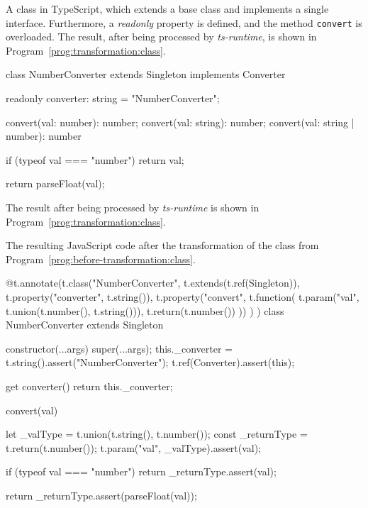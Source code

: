\begin{program}
\caption{A class in TypeScript, which extends a base class and implements a single interface. Furthermore, a \emph{readonly} property is defined, and the method \texttt{convert} is overloaded. The result, after being processed by \emph{ts-runtime}, is shown in Program~\ref{prog:transformation:class}.}
\label{prog:before-transformation:class}
\begin{JsCode}
class NumberConverter extends Singleton implements Converter {

  readonly converter: string = "NumberConverter";

  convert(val: number): number;
  convert(val: string): number;
  convert(val: string | number): number {
    if (typeof val === "number") {
      return val;
    }
        
    return parseFloat(val);
  }

}
\end{JsCode}
\end{program}
The result after being processed by \emph{ts-runtime} is shown in Program~\ref{prog:transformation:class}.
\begin{program}
\caption{The resulting JavaScript code after the transformation of the class from Program~\ref{prog:before-transformation:class}.}
\label{prog:transformation:class}
\begin{JsCode}
@t.annotate(t.class("NumberConverter", t.extends(t.ref(Singleton)),
  t.property("converter", t.string()),
  t.property("convert",
    t.function(
      t.param("val", t.union(t.number(), t.string())),
      t.return(t.number())
    ))
  )
)
class NumberConverter extends Singleton {

  constructor(...args) {
    super(...args);
    this._converter = t.string().assert("NumberConverter");
    t.ref(Converter).assert(this);
  }
  
  get converter() {
    return this._converter;
  }
  
  convert(val) {
    let _valType = t.union(t.string(), t.number());
    const _returnType = t.return(t.number());
    t.param("val", _valType).assert(val);
    
    if (typeof val === "number") {
      return _returnType.assert(val);
    }
    
    return _returnType.assert(parseFloat(val));
  }
  
}
\end{JsCode}
\end{program}

